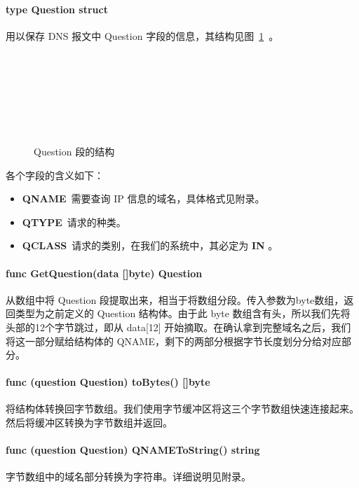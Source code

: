 \documentclass[blue,normal,cn]{elegantnote}
\begin{document}
\paragraph{type Question struct} 用以保存 DNS 报文中 Question 字段的信息，其结构见图~\ref{dns_question}~。
\begin{figure}[!htbp]
	\centering
	\begin{bytefield}[bitwidth=2em]{16}
		 \\
		 \\
		\skippedwords \\
		 \\
		 \\
		 \\
	\end{bytefield}
	\caption{\label{dns_question} Question 段的结构}
\end{figure}
各个字段的含义如下：
\begin{itemize}
	\item \textbf{QNAME}\ 需要查询 IP 信息的域名，具体格式见附录。
	\item \textbf{QTYPE}\ 请求的种类。
	\item \textbf{QCLASS}\ 请求的类别，在我们的系统中，其必定为 \textbf{IN} 。
\end{itemize}
 
\paragraph{func GetQuestion(data []byte) Question} 从数组中将 Question 段提取出来，相当于将数组分段。传入参数为byte数组，返回类型为之前定义的 Question 结构体。由于此 byte 数组含有头，所以我们先将头部的12个字节跳过，即从 data[12] 开始摘取。在确认拿到完整域名之后，我们将这一部分赋给结构体的 QNAME，剩下的两部分根据字节长度划分分给对应部分。

\paragraph{func (question Question) toBytes() []byte} 将结构体转换回字节数组。我们使用字节缓冲区将这三个字节数组快速连接起来。然后将缓冲区转换为字节数组并返回。

\paragraph{func (question Question) QNAMEToString() string} 字节数组中的域名部分转换为字符串。详细说明见附录。
\end{document}
